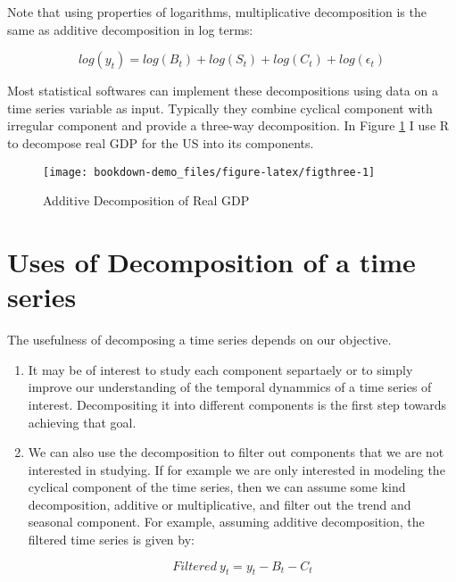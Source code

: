 \documentclass[]{book}
\theoremstyle{definition}
\theoremstyle{definition}
\theoremstyle{definition}
\theoremstyle{remark}
\begin{document}
Note that using properties of logarithms, multiplicative decomposition
is the same as additive decomposition in log terms:

\begin{equation}
log(y_t)= log(B_t) + log(S_t) + log(C_t) + log(\epsilon_t)
\end{equation}

Most statistical softwares can implement these decompositions using data
on a time series variable as input. Typically they combine cyclical
component with irregular component and provide a three-way
decomposition. In Figure \ref{fig:figthree} I use R to decompose real
GDP for the US into its components.

\begin{figure}

{\centering \texttt{[image: bookdown-demo\_files/figure-latex/figthree-1]} 

}

\caption{ Additive Decomposition of Real GDP}\label{fig:figthree}
\end{figure}

\section{Uses of Decomposition of a time
series}\label{uses-of-decomposition-of-a-time-series}

The usefulness of decomposing a time series depends on our objective.

\begin{enumerate}
\def\labelenumi{\arabic{enumi}.}
\item
  It may be of interest to study each component separtaely or to simply
  improve our understanding of the temporal dynammics of a time series
  of interest. Decompositing it into different components is the first
  step towards achieving that goal.
\item
  We can also use the decomposition to filter out components that we are
  not interested in studying. If for example we are only interested in
  modeling the cyclical component of the time series, then we can assume
  some kind decomposition, additive or multiplicative, and filter out
  the trend and seasonal component. For example, assuming additive
  decomposition, the filtered time series is given by:

  \begin{equation}
  Filtered \ y_t= y_t-B_t-C_t
  \end{equation}
\end{enumerate}
\end{document}
